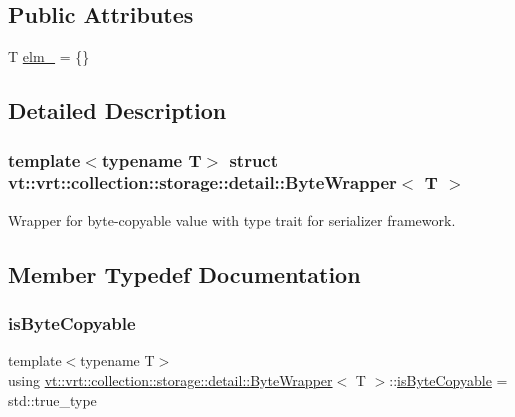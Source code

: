 \subsection*{Public Attributes}
\begin{DoxyCompactItemize}
\item 
T \hyperlink{structvt_1_1vrt_1_1collection_1_1storage_1_1detail_1_1_byte_wrapper_a096426db91a09454dcddc22686eb755d}{elm\+\_\+} = \{\}
\end{DoxyCompactItemize}


\subsection{Detailed Description}
\subsubsection*{template$<$typename T$>$\newline
struct vt\+::vrt\+::collection\+::storage\+::detail\+::\+Byte\+Wrapper$<$ T $>$}

Wrapper for byte-\/copyable value with type trait for serializer framework. 



\subsection{Member Typedef Documentation}
\mbox{\label{structvt_1_1vrt_1_1collection_1_1storage_1_1detail_1_1_byte_wrapper_acdae72612118580333a7c1422f191d67}} 
\subsubsection{\texorpdfstring{is\+Byte\+Copyable}{isByteCopyable}}
{\footnotesize\ttfamily template$<$typename T$>$ \\
using \hyperlink{structvt_1_1vrt_1_1collection_1_1storage_1_1detail_1_1_byte_wrapper}{vt\+::vrt\+::collection\+::storage\+::detail\+::\+Byte\+Wrapper}$<$ T $>$\+::\hyperlink{structvt_1_1vrt_1_1collection_1_1storage_1_1detail_1_1_byte_wrapper_acdae72612118580333a7c1422f191d67}{is\+Byte\+Copyable} =  std\+::true\+\_\+type}



